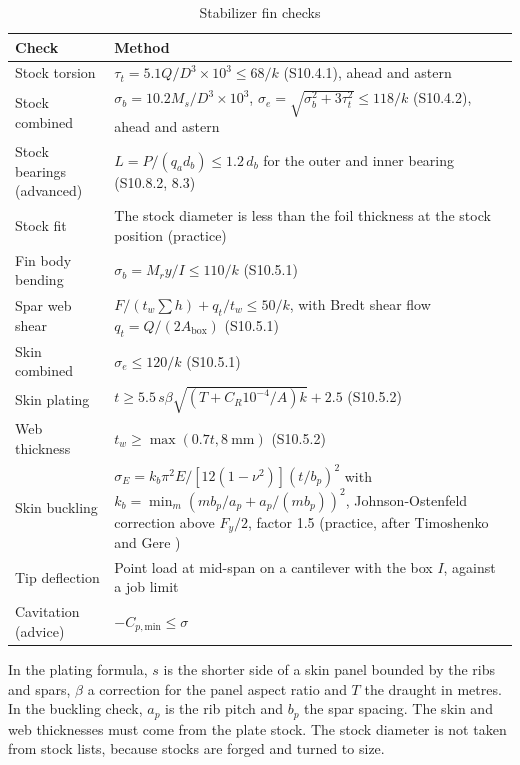 \begin{table}[H]
\centering
\caption{Stabilizer fin checks}
\label{tab:fin-checks}
\small
\begin{tabularx}{\textwidth}{>{\raggedright\arraybackslash}p{}X}
\toprule
\textbf{Check} & \textbf{Method}\\
\midrule
Stock torsion & $\tau_t = 5.1Q/D^3 \times 10^3 \leq 68/k$ (S10.4.1), ahead and astern\\
Stock combined & $\sigma_b = 10.2M_s/D^3 \times 10^3$, $\sigma_e = \sqrt{\sigma_b^2 + 3\tau_t^2} \leq 118/k$ (S10.4.2), ahead and astern\\
Stock bearings (advanced) & $L = P/(q_a d_b) \leq 1.2\,d_b$ for the outer and inner bearing (S10.8.2, 8.3)\\
Stock fit & The stock diameter is less than the foil thickness at the stock position (practice)\\
Fin body bending & $\sigma_b = M_r y/I \leq 110/k$ (S10.5.1)\\
Spar web shear & $F/(t_w\sum h) + q_t/t_w \leq 50/k$, with Bredt shear flow $q_t = Q/(2A_\text{box})$ (S10.5.1)\\
Skin combined & $\sigma_e \leq 120/k$ (S10.5.1)\\
Skin plating & $t \geq 5.5\, s\beta\sqrt{(T + C_R 10^{-4}/A)k} + 2.5$ (S10.5.2)\\
Web thickness & $t_w \geq \max(0.7t, 8~\text{mm})$ (S10.5.2)\\
Skin buckling & $\sigma_E = k_b\pi^2E/[12(1-\nu^2)](t/b_p)^2$ with $k_b = \min_m (m b_p/a_p + a_p/(m b_p))^2$, Johnson-Ostenfeld correction above $F_y/2$, factor 1.5 (practice, after Timoshenko and Gere \cite{timoshenko1961})\\
Tip deflection & Point load at mid-span on a cantilever with the box $I$, against a job limit\\
Cavitation (advice) & $-C_{p,\text{min}} \leq \sigma$\\
\bottomrule
\end{tabularx}
\end{table}

In the plating formula, $s$ is the shorter side of a skin panel bounded by
the ribs and spars, $\beta$ a correction for the panel aspect ratio and $T$
the draught in metres. In the buckling check, $a_p$ is the rib pitch and $b_p$
the spar spacing. The skin and web thicknesses must
come from the plate stock. The stock diameter is not taken from stock lists,
because stocks are forged and turned to size.


